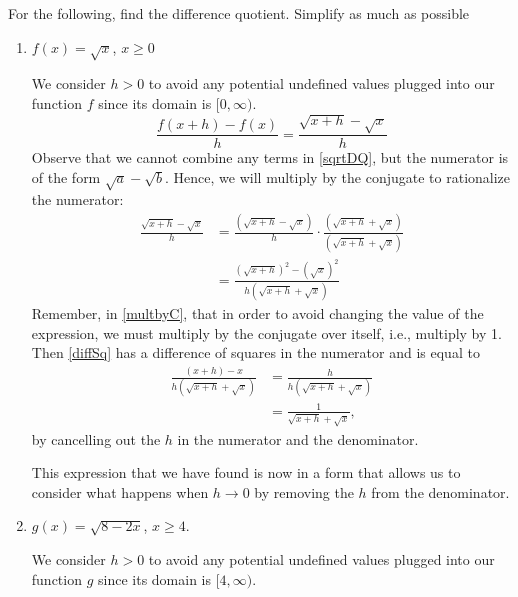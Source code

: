 \documentclass{ximera}
\begin{document}
%
\begin{example}
For the following, find the difference quotient. Simplify as much as possible
  \begin{enumerate}
  \item $f(x) = \sqrt{x}$, $x \geq 0$

    \begin{explanation}
    We consider $h>0$ to avoid any potential undefined values plugged into our function $f$ since its domain is $[0,\infty)$.
    \begin{equation}\label{sqrtDQ}
     \frac{f(x+h) - f(x)}{h} = \frac{\sqrt{x+h} - \sqrt{x}}{h}
    \end{equation}
    Observe that we cannot combine any terms in \eqref{sqrtDQ}, but the numerator is of the form $\sqrt{a} - \sqrt{b}$. Hence, we will multiply by the conjugate to rationalize the numerator:
   \begin{align}
   \frac{\sqrt{x+h} - \sqrt{x}}{h} & =  \frac{(\sqrt{x+h} - \sqrt{x})}{h} \cdot  \frac{(\sqrt{x+h} + \sqrt{x})}{(\sqrt{x+h} + \sqrt{x})} \label{multbyC} \\
   &=  \frac{(\sqrt{x+h})^2 - (\sqrt{x})^2}{h(\sqrt{x+h}+\sqrt{x})}\label{diffSq}
   \end{align}
   Remember, in \eqref{multbyC}, that in order to avoid changing the value of the expression, we must multiply by the conjugate over itself, i.e., multiply by 1. Then \eqref{diffSq} has a difference of squares in the numerator and is equal to 
   \begin{align*}
    \frac{(x+h) - x}{h(\sqrt{x+h} + \sqrt{x})} & = \frac{h}{h(\sqrt{x+h}+\sqrt{x})} \\
    &=\frac{1}{\sqrt{x+h}+\sqrt{x}},
   \end{align*} 
   by cancelling out the $h$ in the numerator and the denominator. 
   
   This expression that we have found is now in a form that allows us to consider what happens when $h \rightarrow 0$ by removing the $h$ from the denominator. 
       \end{explanation}
  \item $g(x) = \sqrt{8-2x}$, $x \geq 4$.\\
  \begin{explanation}
  We consider $h>0$ to avoid any potential undefined values plugged into our function $g$ since its domain is $[4,\infty)$.


\end{explanation}
\end{enumerate}
\end{example}
\end{document}
